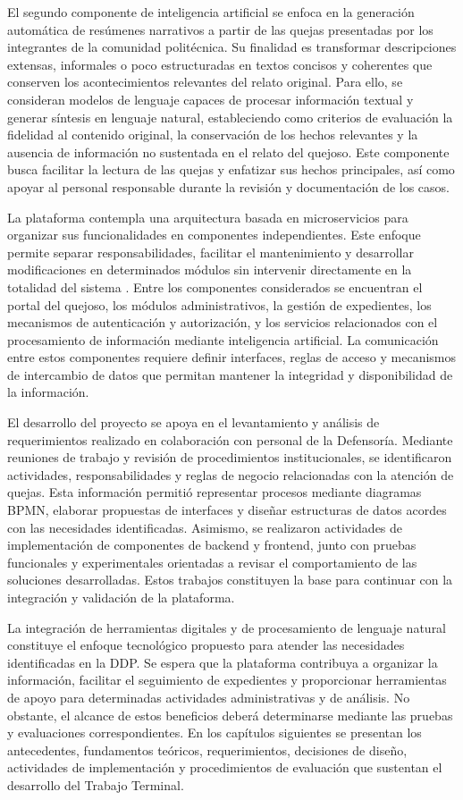 El segundo componente de inteligencia artificial se enfoca en la generación automática de resúmenes narrativos a partir de las quejas presentadas por los integrantes de la comunidad politécnica. Su finalidad es transformar descripciones extensas, informales o poco estructuradas en textos concisos y coherentes que conserven los acontecimientos relevantes del relato original. Para ello, se consideran modelos de lenguaje capaces de procesar información textual y generar síntesis en lenguaje natural, estableciendo como criterios de evaluación la fidelidad al contenido original, la conservación de los hechos relevantes y la ausencia de información no sustentada en el relato del quejoso. Este componente busca facilitar la lectura de las quejas y enfatizar sus hechos principales, así como apoyar al personal responsable durante la revisión y documentación de los casos.

La plataforma contempla una arquitectura basada en microservicios para organizar sus funcionalidades en componentes independientes. Este enfoque permite separar responsabilidades, facilitar el mantenimiento y desarrollar modificaciones en determinados módulos sin intervenir directamente en la totalidad del sistema \cite{aws_microservicios, villamizar_microservices}. Entre los componentes considerados se encuentran el portal del quejoso, los módulos administrativos, la gestión de expedientes, los mecanismos de autenticación y autorización, y los servicios relacionados con el procesamiento de información mediante inteligencia artificial. La comunicación entre estos componentes requiere definir interfaces, reglas de acceso y mecanismos de intercambio de datos que permitan mantener la integridad y disponibilidad de la información.

El desarrollo del proyecto se apoya en el levantamiento y análisis de requerimientos realizado en colaboración con personal de la Defensoría. Mediante reuniones de trabajo y revisión de procedimientos institucionales, se identificaron actividades, responsabilidades y reglas de negocio relacionadas con la atención de quejas. Esta información permitió representar procesos mediante diagramas BPMN, elaborar propuestas de interfaces y diseñar estructuras de datos acordes con las necesidades identificadas. Asimismo, se realizaron actividades de implementación de componentes de backend y frontend, junto con pruebas funcionales y experimentales orientadas a revisar el comportamiento de las soluciones desarrolladas. Estos trabajos constituyen la base para continuar con la integración y validación de la plataforma.

La integración de herramientas digitales y de procesamiento de lenguaje natural constituye el enfoque tecnológico propuesto para atender las necesidades identificadas en la DDP. Se espera que la plataforma contribuya a organizar la información, facilitar el seguimiento de expedientes y proporcionar herramientas de apoyo para determinadas actividades administrativas y de análisis. No obstante, el alcance de estos beneficios deberá determinarse mediante las pruebas y evaluaciones correspondientes. En los capítulos siguientes se presentan los antecedentes, fundamentos teóricos, requerimientos, decisiones de diseño, actividades de implementación y procedimientos de evaluación que sustentan el desarrollo del Trabajo Terminal.